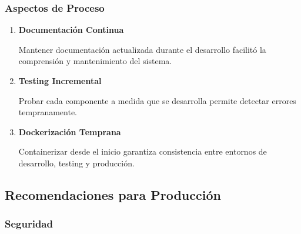 \documentclass[12pt,a4paper]{article}
\begin{document}
\subsubsection{Aspectos de Proceso}

\begin{enumerate}[leftmargin=*]
    \item \textbf{Documentación Continua}

    Mantener documentación actualizada durante el desarrollo facilitó la comprensión y mantenimiento del sistema.

    \item \textbf{Testing Incremental}

    Probar cada componente a medida que se desarrolla permite detectar errores tempranamente.

    \item \textbf{Dockerización Temprana}

    Containerizar desde el inicio garantiza consistencia entre entornos de desarrollo, testing y producción.
\end{enumerate}

\subsection{Recomendaciones para Producción}

\subsubsection{Seguridad}
\end{document}
